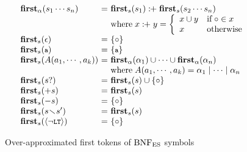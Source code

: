 \begin{figure}[t]
\centering
\small
\[
  \begin{array}{l@{~}c@{~}l}
    \rhsfirst{\symb_1 \cdots \symb_n} &=& \symbfirst{\symb_1} \firstplus
    \symbfirst{\symb_2 \cdots \symb_n}\\
    && \text{where} \; x \firstplus y = \left\{
    \begin{array}{ll}
      x \cup y & \text{if} \; \emptyfirst \in x\\
      x & \text{otherwise}\\
    \end{array}
    \right.\\
    \symbfirst{\epsilon} &=& \{ \emptyfirst \}\\
    \symbfirst{\T{a}} &=& \{ \T{a} \} \\
    \symbfirst{\NT{A}(\argument_1, \cdots, \argument_k)} &=&
    \rhsfirst{\rhs_1} \cup \cdots \cup \rhsfirst{\rhs_n}\\
    && \text{where} \; \NT{A}(\argument_1, \cdots, \argument_k) =
    \rhs_1 \mid \cdots \mid \rhs_n\\
    \symbfirst{\symb?} &=& \symbfirst{\symb} \cup \{ \emptyfirst \}\\
    \symbfirst{+\symb} &=& \symbfirst{\symb}\\
    \symbfirst{-\symb} &=& \{ \emptyfirst \}\\
    \symbfirst{\symb \butnot \symb'} &=& \symbfirst{\symb}\\
    \symbfirst{\nolt} &=& \{ \emptyfirst \}
  \end{array}
\]
\vspace*{-1em}
\caption{Over-approximated first tokens of \( \text{BNF}_{\text{ES}} \) symbols}
\label{fig:first-tokens}
\end{figure}

\smallskip


